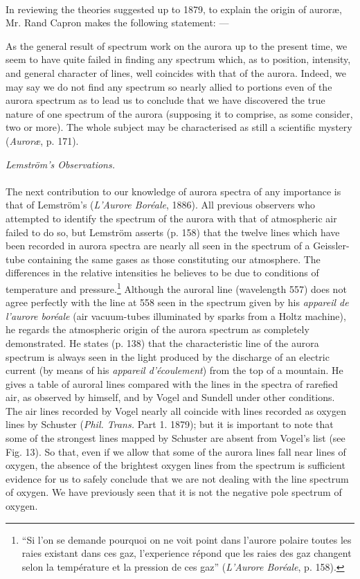 \documentclass[a4paper, 12pt, oneside, polutonikogreek, english]{article}
\begin{document}
\paragraph{}
In reviewing the theories suggested up to 1879, to explain the origin of auroræ, Mr. Rand Capron makes the following statement: ---

As the general result of spectrum work on the aurora up to the present time, we seem to have quite failed in finding any spectrum which, as to position, intensity, and general character of lines, well coincides with that of the aurora. Indeed, we may say we do not find any spectrum so nearly allied to portions even of the aurora spectrum as to lead us to conclude that we have discovered the true nature of one spectrum of the aurora (supposing it to comprise, as some consider, two or more). The whole subject may be characterised as still a scientific mystery (\emph{Auroræ}, p. 171).
\begin{center}
\emph{Lemström's Observations.}
\end{center}
\paragraph{}
The next contribution to our knowledge of aurora spectra of any importance is that of Lemström's (\emph{L'Aurore Boréale}, 1886). All previous observers who attempted to identify the spectrum of the aurora with that of atmospheric air failed to do so, but Lemström asserts (p. 158) that the twelve lines which have been recorded in aurora spectra are nearly all seen in the spectrum of a Geissler-tube containing the same gases as those constituting our atmosphere. The differences in the relative intensities he believes to be due to conditions of temperature and pressure.\footnote{``Si l'on se demande pourquoi on ne voit point dans l'aurore polaire toutes les raies existant dans ces gaz, l'experience répond que les raies des gaz changent selon la température et la pression de ces gaz'' (\emph{L'Aurore Boréale}, p. 158).} Although the auroral line (wavelength 557) does not agree perfectly with the line at 558 seen in the spectrum given by his \emph{appareil de l'aurore boréale} (air vacuum-tubes illuminated by sparks from a Holtz machine), he regards the atmospheric origin of the aurora spectrum as completely demonstrated. He states (p. 138) that the characteristic line of the aurora spectrum is always seen in the light produced by the discharge of an electric current (by means of his \emph{appareil d'écoulement}) from the top of a mountain. He gives a table of auroral lines compared with the lines in the spectra of rarefied air, as observed by himself, and by Vogel and Sundell under other conditions. The air lines recorded by Vogel nearly all coincide with lines recorded as oxygen lines by Schuster (\emph{Phil. Trans.} Part 1. 1879); but it is important to note that some of the strongest lines mapped by Schuster are absent from Vogel's list (see Fig. 13). So that, even if we allow that some of the aurora lines fall near lines of oxygen, the absence of the brightest oxygen lines from the spectrum is sufficient evidence for us to safely conclude that we are not dealing with the line spectrum of oxygen. We have previously seen that it is not the negative pole spectrum of oxygen.
\end{document}
